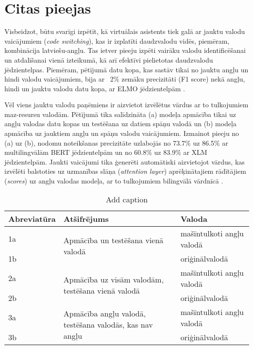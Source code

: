 \section{Citas pieejas}

Visbeidzot, būtu svarīgi izpētīt, kā virtuālais asistents tiek galā ar jauktu valodu vaicājumiem (\textit{code switching}), kas ir izplatīti daudzvalodu vidēs, piemēram, kombinācija latviešu-angļu. Tas ietver pieeju izpēti vairāku valodu identificēšanai un atdalīšanai vienā izteikumā, kā arī efektīvi pielietotas daudzvalodu jēdzientelpas. Piemēram, pētījumā datu kopa, kas sastāv tikai no jauktu angļu un hindi valodu vaicājumiem, bija ar ~2\% zemāku precizitāti (F1 score) nekā angļu, hindi un jauktu valodu datu kopa, ar ELMO jēdzientelpām \cite{jayarao2018}.

Vēl viens jauktu valodu paņēmiens ir aizvietot izvēlētus vārdus ar to tulkojumiem maz-resursu valodām. Pētījumā \cite{liu2020} tika salīdzināta (a) modeļa apmācība tikai uz angļu valodas datu kopas un testēšana uz datiem spāņu valodā un (b) modeļa apmācība uz jauktiem angļu un spāņu valodu vaicājumiem. Izmainot pieeju no (a) uz (b), nodomu noteikšanas precizitāte uzlabojās no 73.7\% uz 86.5\% ar multilingvālām BERT jēdzientelpām un no 60.8\% uz 83.9\% ar XLM jēdzientelpām. Jaukti vaicājumi tika ģenerēti automātiski aizvietojot vārdus, kas izvēlēti balstoties uz uzmanības slāņa (\textit{attention layer}) aprēķinātajiem rādītājiem (\textit{scores}) uz angļu valodas modeļa, ar to tulkojumiem bilingvālā vārdnīcā \cite{liu2020}.



\begin{table}[htbp]
  \centering
  \caption{Add caption}
    \begin{tabular}{lll}\toprule
    Abreviatūra & Atšifrējums & Valoda \\\midrule
    1a    & \multicolumn{1}{l}{\multirow{2}[0]{*}{Apmācība un testēšana vienā valodā}} & mašīntulkoti angļu valodā \\
    1b    &       & oriģinālvalodā \\\midrule
    2a    & \multicolumn{1}{l}{\multirow{2}[0]{*}{Apmācība uz visām valodām, testēšana vienā valodā}} & mašīntulkoti angļu valodā \\
    2b    &       & oriģinālvalodā \\\midrule
    3a    & \multicolumn{1}{l}{\multirow{2}[0]{*}{Apmācība angļu valodā, testēšana valodās, kas nav angļu}} & mašīntulkoti angļu valodā \\
    3b    &       & oriģinālvalodā \\\bottomrule
    \end{tabular}%
  \label{tab:addlabel}%
\end{table}%



